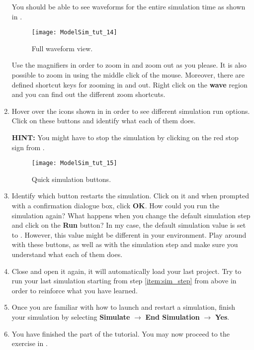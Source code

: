 \documentclass[number=01]{assignment}
\begin{document}
\begin{enumerate}
You should be able to see waveforms for the entire simulation time as shown in .
%
%
\begin{figure}[!htb]
\centering
\texttt{[image: ModelSim\_tut\_14]}
\caption{Full waveform view.}
\label{Figure:Full_wave}
\end{figure}
%
%

Use the magnifiers in order to zoom in and zoom out as you please.
It is also possible to zoom in using the middle click of the mouse. 
Moreover, there are defined shortcut keys for zooming in and out. 
Right click on the \textbf{wave} region and you can find out the different zoom shortcuts.

\item Hover over the icons shown in  in order to see different simulation run options.
Click on these buttons and identify what each of them does. 

\textbf{HINT:} You might have to  stop the simulation by clicking on the red stop sign from .

%
%
\begin{figure}[!htb]
\centering
\texttt{[image: ModelSim\_tut\_15]}
\caption{Quick simulation buttons.}
\label{Figure:Sim_icons}
\end{figure}
%
%
\item Identify which button restarts the simulation. Click on it and when prompted with a confirmation dialogue box, click \textbf{OK}. 
How could you run the simulation again? 
What happens when you change the default simulation step and click on the \textbf{Run} button? 
In my case, the default simulation value is set to . 
However, this value might be different in your environment.
Play around with these buttons, as well as with the simulation step and make sure you understand what each of them does.

\item Close \ModelSim and open it again, it will automatically load your last project.
Try to run your last simulation starting from step \ref{item:sim_step} from above in order to reinforce what you have learned.
\item Once you are familiar with how to launch and restart a simulation, finish your simulation by selecting \textbf{Simulate} $\rightarrow$ \textbf{End Simulation} $\rightarrow$ \textbf{Yes}.
\item You have finished the \ModelSim part of the tutorial. 
You may now proceed to the \ModelSim exercise in .
\end{enumerate}
\end{document}
